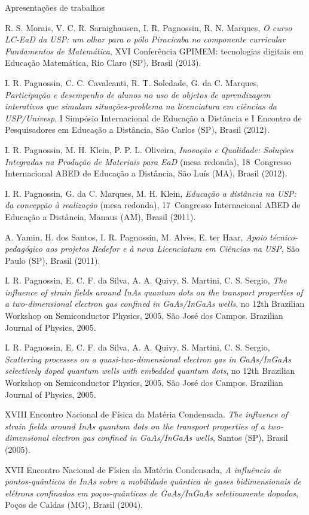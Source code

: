 \begin{compactitem}
  \item Apresentações de trabalhos
  \begin{compactitem}
    \item R. S. Morais, V. C. R. Sarnighausen, I. R. Pagnossin, R. N. Marques, \textsl{O curso LC-EaD da USP: um olhar para o pólo Piracicaba no componente curricular Fundamentos de Matemática}, XVI Conferência GPIMEM: tecnologias digitais em Educação Matemática, Rio Claro (SP), Brasil (2013).    
    \item I. R. Pagnossin, C. C. Cavalcanti, R. T. Soledade, G. da C. Marques, \textsl{Participação e desempenho de alunos no uso de objetos de aprendizagem interativos que simulam situações-problema na licenciatura em ciências da USP/Univesp}, I Simpósio Internacional de Educação a Distância e I Encontro de Pesquisadores em Educação a Distância, São Carlos (SP), Brasil (2012).
    \item I. R. Pagnossin, M. H. Klein, P. P. L. Oliveira, \textsl{Inovação e Qualidade: Soluções Integradas na Produção de Materiais para EaD} (mesa redonda), 18\textordmasculine\ Congresso Internacional ABED de Educação a Distância, São Luís (MA), Brasil (2012).
    \item I. R. Pagnossin, G. da C. Marques, M. H. Klein, \textsl{Educação a distância na USP: da concepção à realização} (mesa redonda), 17\textordmasculine\ Congresso Internacional ABED de Educação a Distância, Manaus (AM), Brasil (2011).
    \item A. Yamin, H. dos Santos, I. R. Pagnossin, M. Alves, E. ter Haar, \textsl{Apoio técnico-pedagó\-gico aos projetos Redefor e à nova Licenciatura em Ciências na USP}, São Paulo (SP), Brasil (2011).
    \item I. R. Pagnossin, E. C. F. da Silva, A. A. Quivy, S. Martini, C. S. Sergio, \textsl{The influence of strain fields around InAs quantum dots on the transport properties of a two-dimensional electron gas confined in GaAs/InGaAs wells}, no 12th Brazilian Workshop on Semiconductor Physics, 2005, São José dos Campos. Brazilian Journal of Physics, 2005.
    \item I. R. Pagnossin, E. C. F. da Silva, A. A. Quivy, S. Martini, C. S. Sergio, \textsl{Scattering processes on a quasi-two-dimensional electron gas in GaAs/InGaAs selectively doped quantum wells with embedded quantum dots}, no 12th Brazilian Workshop on Semiconductor Physics, 2005, São José dos Campos. Brazilian Journal of Physics, 2005.
    \item XVIII Encontro Nacional de Física da Matéria Condensada. \textsl{The influence of strain fields around InAs quantum dots on the transport properties of a two-dimensional electron gas confined in GaAs/InGaAs wells}, Santos (SP), Brasil (2005).
    \item XVII Encontro Nacional de Física da Matéria Condensada, \textsl{A influência de pontos-quânticos de InAs sobre a mobilidade quântica de gases bidimensionais de elétrons confinados em poços-quânticos de GaAs/InGaAs seletivamente dopados}, Poços de Caldas (MG), Brasil (2004).
  \end{compactitem}
\end{compactitem}

